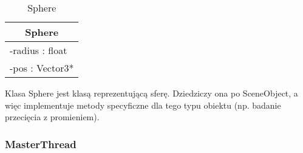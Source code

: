 \footnotesize
\begin{longtable}{|p{14cm}|}
    \caption{Sphere} \label{tab:Sphere} \\ \hline
    \multicolumn{1}{|c|}{Sphere} \\ \hline
    -radius : float \\
    -pos : Vector3* \\
    \hline
\end{longtable}
\normalsize

Klasa Sphere jest klasą reprezentującą sferę. Dziedziczy ona po SceneObject, a więc implementuje metody specyficzne dla tego typu obiektu (np. badanie przecięcia z promieniem).

\subsubsection{MasterThread}

